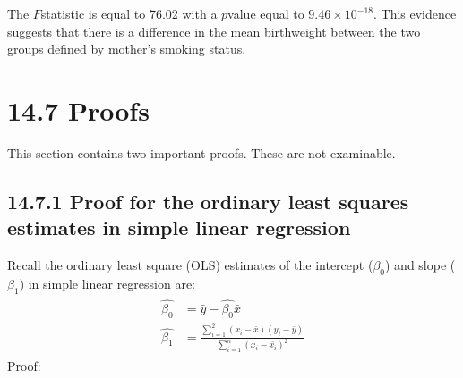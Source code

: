 \documentclass[letterpaper,10pt,english]{jupyterBook}
\begin{document}
\sphinxAtStartPar
The \(F\)\sphinxhyphen{}statistic is equal to 76.02 with a \(p\)\sphinxhyphen{}value equal to \(9.46\times10^{-18}\). This evidence suggests that there is a difference in the mean birthweight between the two groups defined by mother’s smoking status.


\section{14.7 Proofs}
\label{\detokenize{14.h. Linear Regression III:proofs}}\label{\detokenize{14.h. Linear Regression III::doc}}
\sphinxAtStartPar
This section contains two important proofs. These are not examinable.


\subsection{14.7.1 Proof for the ordinary least squares estimates in simple linear regression}
\label{\detokenize{14.h. Linear Regression III:proof-for-the-ordinary-least-squares-estimates-in-simple-linear-regression}}
\sphinxAtStartPar
Recall the ordinary least square (OLS) estimates of the intercept (\(\beta_0\)) and slope (\(\beta_1\)) in simple linear regression are:
\begin{equation*}
\begin{split}
\begin{align}
\hat{\beta_0} &= \bar{y} - \hat{\beta_0}\bar{x} \\
\hat{\beta_1} &= \frac{\sum_{i=1}^2 (x_i-\bar{x})(y_i-\bar{y})}{\sum_{i=1}^n (x_i-\bar{x_i})^2}
\end{align}
\end{split}
\end{equation*}
\sphinxAtStartPar
Proof:
\end{document}
